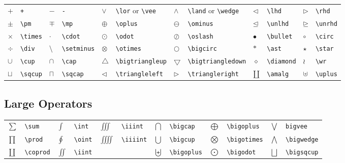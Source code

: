 \documentclass[10pt, english]{article}
\begin{document}
	\begin{center}
		\scriptsize
	\begin{tabular}{ll|ll|ll|ll|ll|ll}
		$+$ & \verb|+| & $-$ & \verb|-| & $\lor$ & \verb|\lor| or \verb|\vee| & $\land$ & \verb|\land| or \verb|\wedge| & $\lhd$ & \verb|\lhd| & $\rhd$ & \verb|\rhd| \\ 
		$\pm$ & \verb|\pm| & $\mp$ & \verb|\mp| & $\oplus$ & \verb|\oplus| & $\ominus$ & \verb|\ominus| & $\unlhd$ & \verb|\unlhd| & $\unrhd$ & \verb|\unrhd| \\
		$\times$ & \verb|\times| & $\cdot$ & \verb|\cdot| & $\odot$ & \verb|\odot| & $\oslash$ & \verb|\oslash| & $\bullet$ & \verb|\bullet| & $\circ$ & \verb|\circ| \\
		$\div$ & \verb|\div| & $\setminus$ & \verb|\setminus| & $\otimes$ & \verb|\otimes| & $\bigcirc$ & \verb|\bigcirc| & $\ast$ & \verb|\ast| & $\star$ & \verb|\star| \\
		$\cup$ & \verb|\cup| & $\cap$ & \verb|\cap| & $\bigtriangleup$ & \verb|\bigtriangleup| & $\bigtriangledown$ & \verb|\bigtriangledown| & $\diamond$ & \verb|\diamond| & $\wr$ & \verb|\wr| \\ 
		$\sqcup$ & \verb|\sqcup| & $\sqcap$ & \verb|\sqcap| & $\triangleleft$ & \verb|\triangleleft| & $\triangleright$ & \verb|\triangleright| & $\amalg$ & \verb|\amalg| & $\uplus$ & \verb|\uplus| \\
	\end{tabular}
	\end{center}

	\subsection{Large Operators}

	\begin{center}
		\scriptsize
	\begin{tabular}{ll|ll|ll|ll|ll|ll}
		$\sum$ & \verb|\sum| & $\int$ & \verb|\int| & $\iiint$ & \verb|\iiint| & $\bigcap$ & \verb|\bigcap| & $\bigoplus$ & \verb|\bigoplus| & $\bigvee$ & \verb|bigvee|\\
		$\prod$ & \verb|\prod| & $\oint$ & \verb|\oint| & $\iiiint$ & \verb|\iiiint| & $\bigcup$ & \verb|\bigcup| & $\bigotimes$ & \verb|\bigotimes| & $\bigwedge$ & \verb|\bigwedge|\\
		$\coprod$ & \verb|\coprod| & $\iint$ & \verb|\iint| & & & $\biguplus$ & \verb|\bigoplus| & $\bigodot$ & \verb|\bigodot| & $\bigsqcup$ & \verb|\bigsqcup|\\
	\end{tabular}
	\end{center}
\end{document}

